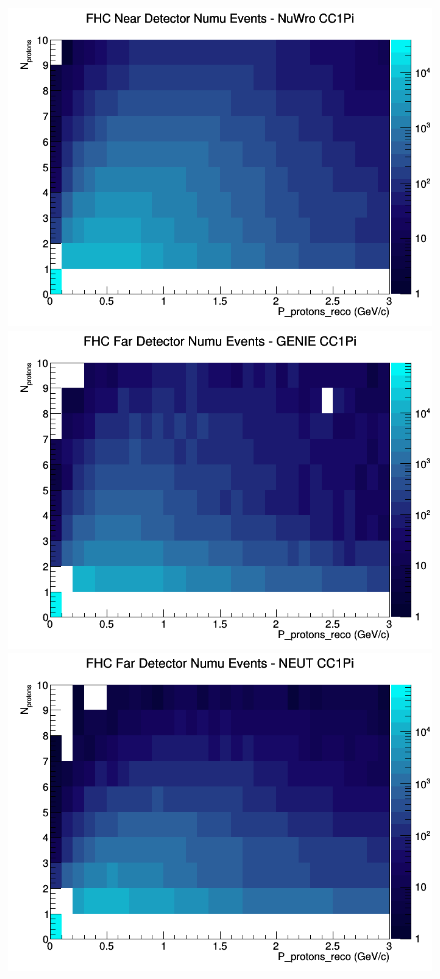 \documentclass[12pt]{article}
\begin{document}
\begin{figure}[h]
\includegraphics[width=\linewidth]{eff_N_P/GAr/protons/CC1Pi_FHC_ND_numu_N_P_NuWro.png}
\endminipage
\newline
{}
\includegraphics[width=\linewidth]{eff_N_P/GAr/protons/CC1Pi_FHC_FD_numu_N_P_GENIE.png}
\endminipage
{}
\includegraphics[width=\linewidth]{eff_N_P/GAr/protons/CC1Pi_FHC_FD_numu_N_P_NEUT.png}

\end{figure}
\end{document}
